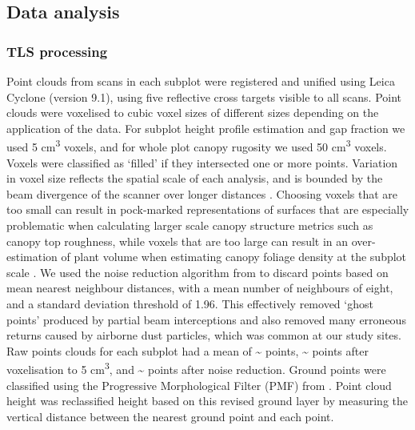 \documentclass[11pt,a4paper]{article}
\begin{document}
\subsection{Data analysis}

\subsubsection{TLS processing}

Point clouds from scans in each subplot were registered and unified using Leica Cyclone (version 9.1), using five reflective cross targets visible to all scans. Point clouds were voxelised to cubic voxel sizes of different sizes depending on the application of the data. For subplot height profile estimation and gap fraction we used 5 cm\textsuperscript{3} voxels, and for whole plot canopy rugosity we used 50 cm\textsuperscript{3} voxels. Voxels were classified as `filled' if they intersected one or more points. Variation in voxel size reflects the spatial scale of each analysis, and is bounded by the beam divergence of the scanner over longer distances \citep{}. Choosing voxels that are too small can result in pock-marked representations of surfaces that are especially problematic when calculating larger scale canopy structure metrics such as canopy top roughness, while voxels that are too large can result in an over-estimation of plant volume when estimating canopy foliage density at the subplot scale \citep{Seidel2012, Cifuentes2014}. We used the noise reduction algorithm from \citet{Rusu2008} to discard points based on mean nearest neighbour distances, with a mean number of neighbours of eight, and a standard deviation threshold of 1.96. This effectively removed `ghost points' produced by partial beam interceptions and also removed many erroneous returns caused by airborne dust particles, which was common at our study sites. Raw points clouds for each subplot had a mean of \textasciitilde{}\rawpt{} points, \textasciitilde{}\voxelpt{} points after voxelisation to 5 cm\textsuperscript{3}, and \textasciitilde{}\subpt{} points after noise reduction. Ground points were classified using the Progressive Morphological Filter (PMF) from \citet{Zhang2003}. Point cloud height was reclassified height based on this revised ground layer by measuring the vertical distance between the nearest ground point and each point.
\end{document}

